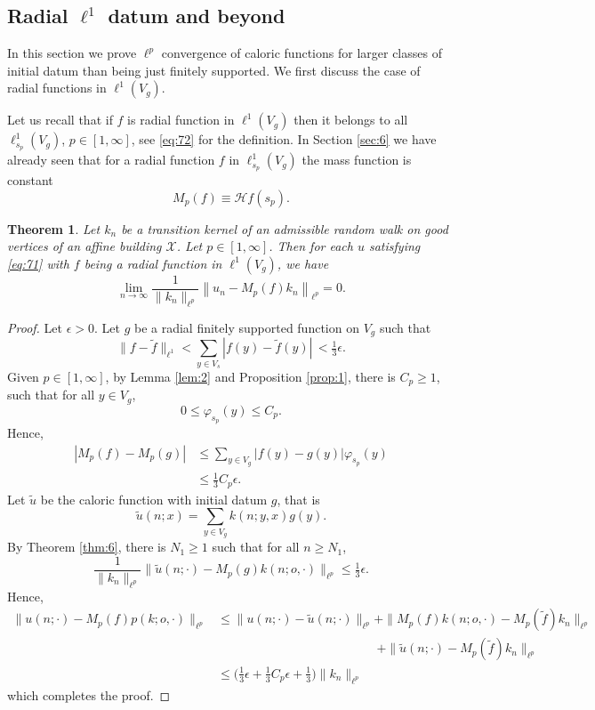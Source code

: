 \documentclass[11pt]{amsart}
\newcommand{\calH}{\mathcal{H}}
\newcommand{\scrX}{\mathscr{X}}
\newcommand{\vphi}{\varphi}
\theoremstyle{plain}
\newcounter{thm}
\newtheorem{theorem}{Theorem}[section]
\theoremstyle{definition}
\numberwithin{equation}{section}
\begin{document}
\subsection{Radial $\ell^1$ datum and beyond}
\label{sec:5}
In this section we prove $\ell^p$ convergence of caloric functions for larger classes of initial datum than being just
finitely supported. We first discuss the case of radial functions in $\ell^1(V_g)$. 

Let us recall that if $f$ is radial function in $\ell^1(V_g)$ then it belongs to all $\ell^1_{s_p}(V_g)$, $p \in [1, \infty]$,
see \eqref{eq:72} for the definition. In Section \ref{sec:6} we have already seen that for a radial function $f$ in
$\ell_{s_p}^1(V_g)$ the mass function is constant
\[
	M_p(f) \equiv \calH f(s_p).
\]
\begin{theorem}
	\label{thm:11}
	Let $k_n$ be a transition kernel of an admissible random walk on good vertices of an affine building $\scrX$.
	Let $p \in [1, \infty]$. Then for each $u$ satisfying \eqref{eq:71} with $f$ being a radial function in $\ell^1(V_g)$,
	we have
	\[
		\lim_{n \to \infty} \frac{1}{\|k_n\|_{\ell^p}}
		\left\| u_n - M_p(f) k_n \right\|_{\ell^p}
		=0.
	\]
\end{theorem}
\begin{proof}
	Let $\epsilon > 0$. Let $g$ be a radial finitely supported function on $V_g$ such that
	\[
		\|f-\widetilde{f}\|_{\ell^1} < \sum_{y\in V_s}|f(y)-\widetilde{f}(y)|\, <\tfrac{1}{3} \epsilon.
	\]
	Given $p \in [1, \infty]$, by Lemma \ref{lem:2} and Proposition \ref{prop:1}, there is $C_p \geqslant 1$, such that
	for all $y \in V_g$,
	\[
		0 \leqslant \vphi_{s_p}(y) \leqslant C_p.
	\]
	Hence,
	\begin{align*}
		|M_p(f) - M_p(g)| 
		&\leqslant \sum_{y \in V_g} |f(y) - g(y)| \vphi_{s_p}(y) \\
		&\leqslant \tfrac{1}{3} C_p \epsilon.
	\end{align*}
	Let $\tilde{u}$ be the caloric function with initial datum $g$, that is
	\[
		\tilde{u}(n; x) = \sum_{y \in V_g} k(n; y, x) g(y).
	\]
	By Theorem \ref{thm:6}, there is $N_1 \geqslant 1$ such that for all $n \geqslant N_1$,
	\[
		\frac{1}{\|k_n\|_{\ell^p}} \big\|\tilde{u}(n; \cdot) - M_p(g) k(n; o, \cdot) \big\|_{\ell^p}
		\leqslant \tfrac{1}{3} \epsilon.
	\]
	Hence,
	\begin{align*}
		\|u(n;\cdot)-M_p(f) p(k; o,\cdot)\|_{\ell^p}
		&\leqslant
		\|u(n;\cdot)-\tilde{u}(n;\cdot)\|_{\ell^p} 
		+\|M_{p}(f) k(n;o, \cdot) - M_p(\tilde{f}) k_n \|_{\ell^p} \\
		&\phantom{\leqslant\|u(n;\cdot)-\tilde{u}(n;\cdot)\|_{\ell^p}\ }
		+\|\tilde{u}(n;\cdot)-M_p(\tilde{f}) k_n \|_{\ell^p} \\
		&\leqslant
		\Big(\tfrac{1}{3} \epsilon + \tfrac{1}{3} C_p \epsilon + \tfrac{1}{3}\Big) \|k_n\|_{\ell^p}
	\end{align*}
	which completes the proof.
\end{proof}
\end{document}
